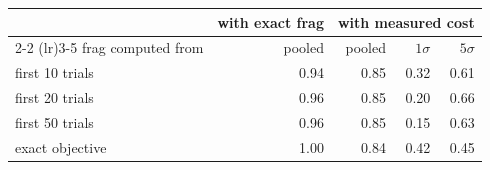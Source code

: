 \begin{tabular}{lrrrr}
\toprule
& \multicolumn{1}{c}{with exact frag} & \multicolumn{3}{c}{with measured cost} \\
\cmidrule(lr){2-2} \cmidrule(lr){3-5}
frag computed from & pooled & pooled & $1\sigma$ & $5\sigma$ \\
\midrule
first 10 trials & 0.94 & 0.85 & 0.32 & 0.61 \\
first 20 trials & 0.96 & 0.85 & 0.20 & 0.66 \\
first 50 trials & 0.96 & 0.85 & 0.15 & 0.63 \\
exact objective & 1.00 & 0.84 & 0.42 & 0.45 \\
\bottomrule
\end{tabular}
